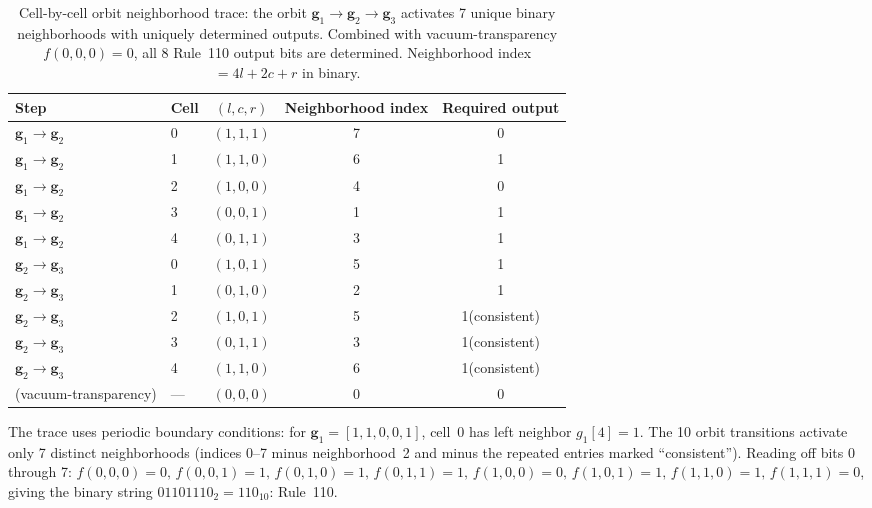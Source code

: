 \documentclass[11pt]{article}
\theoremstyle{remark}
\begin{document}
\begin{table}[H]
\centering
\caption{Cell-by-cell orbit neighborhood trace: the orbit $\mathbf{g}_1 \to \mathbf{g}_2 \to \mathbf{g}_3$
activates 7 unique binary neighborhoods with uniquely determined outputs.
Combined with vacuum-transparency $f(0,0,0)=0$, all 8 Rule~110 output bits are determined.
Neighborhood index $= 4l+2c+r$ in binary.}
\label{tab:orbit_trace}
\small
\renewcommand{\arraystretch}{1.2}
\begin{tabular}{@{}llccc@{}}
\toprule
\textbf{Step} & \textbf{Cell} & \textbf{$(l,c,r)$} & \textbf{Neighborhood index} & \textbf{Required output}\\
\midrule
$\mathbf{g}_1\!\to\!\mathbf{g}_2$ & 0 & $(1,1,1)$ & 7 & 0\\
$\mathbf{g}_1\!\to\!\mathbf{g}_2$ & 1 & $(1,1,0)$ & 6 & 1\\
$\mathbf{g}_1\!\to\!\mathbf{g}_2$ & 2 & $(1,0,0)$ & 4 & 0\\
$\mathbf{g}_1\!\to\!\mathbf{g}_2$ & 3 & $(0,0,1)$ & 1 & 1\\
$\mathbf{g}_1\!\to\!\mathbf{g}_2$ & 4 & $(0,1,1)$ & 3 & 1\\
\midrule
$\mathbf{g}_2\!\to\!\mathbf{g}_3$ & 0 & $(1,0,1)$ & 5 & 1\\
$\mathbf{g}_2\!\to\!\mathbf{g}_3$ & 1 & $(0,1,0)$ & 2 & 1\\
$\mathbf{g}_2\!\to\!\mathbf{g}_3$ & 2 & $(1,0,1)$ & 5 & 1\;(consistent)\\
$\mathbf{g}_2\!\to\!\mathbf{g}_3$ & 3 & $(0,1,1)$ & 3 & 1\;(consistent)\\
$\mathbf{g}_2\!\to\!\mathbf{g}_3$ & 4 & $(1,1,0)$ & 6 & 1\;(consistent)\\
\midrule
(vacuum-transparency) & --- & $(0,0,0)$ & 0 & 0\\
\bottomrule
\end{tabular}
\end{table}

The trace uses periodic boundary conditions: for $\mathbf{g}_1=[1,1,0,0,1]$, cell~0 has
left neighbor $g_1[4]=1$. The 10 orbit transitions activate only 7 distinct neighborhoods
(indices 0--7 minus neighborhood~2 and minus the repeated entries marked ``consistent'').
Reading off bits 0 through 7: $f(0,0,0)=0,\, f(0,0,1)=1,\, f(0,1,0)=1,\, f(0,1,1)=1,\,
f(1,0,0)=0,\, f(1,0,1)=1,\, f(1,1,0)=1,\, f(1,1,1)=0$,
giving the binary string $01101110_2 = 110_{10}$: Rule~110.
\end{document}
